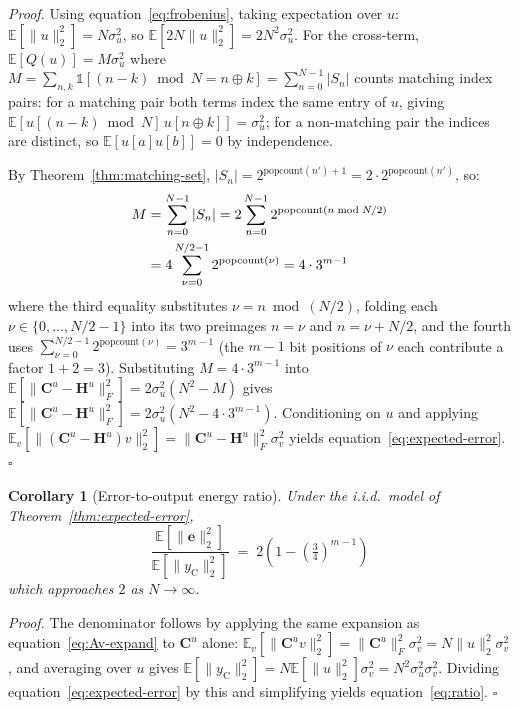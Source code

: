 \documentclass[11pt]{article}
\newtheorem{corollary}[theorem]{Corollary}
\begin{document}
\noindent\textit{Proof.} Using equation~\eqref{eq:frobenius}, taking expectation over $u$: $\mathbb{E}[\|u\|_2^2] = N\sigma_u^2$, so $\mathbb{E}[2N\|u\|_2^2] = 2N^2\sigma_u^2$. For the cross-term, $\mathbb{E}[Q(u)] = M\sigma_u^2$ where $M = \sum_{n,k}\mathbb{1}[(n-k)\bmod N = n\oplus k] = \sum_{n=0}^{N-1}|S_n|$ counts matching index pairs: for a matching pair both terms index the same entry of $u$, giving $\mathbb{E}[u[(n-k)\bmod N]\,u[n\oplus k]] = \sigma_u^2$; for a non-matching pair the indices are distinct, so $\mathbb{E}[u[a]u[b]] = 0$ by independence.

By Theorem~\ref{thm:matching-set}, $|S_n| = 2^{\mathrm{popcount}(n')+1} = 2\cdot 2^{\mathrm{popcount}(n')}$, so:
\begin{align}
    M &= \sum_{n=0}^{N-1}|S_n|
      = 2\sum_{n=0}^{N-1}2^{\mathrm{popcount}(n\bmod N/2)} \notag\\
      &= 4\sum_{\nu=0}^{N/2-1}2^{\mathrm{popcount}(\nu)}
      = 4\cdot 3^{m-1}
\end{align}
where the third equality substitutes $\nu = n\bmod(N/2)$, folding each $\nu \in \{0,\ldots,N/2-1\}$ into its two preimages $n=\nu$ and $n=\nu+N/2$, and the fourth uses $\sum_{\nu=0}^{N/2-1}2^{\mathrm{popcount}(\nu)} = 3^{m-1}$ (the $m-1$ bit positions of $\nu$ each contribute a factor $1+2=3$). Substituting $M = 4\cdot 3^{m-1}$ into $\mathbb{E}[\|\mathbf{C}^u-\mathbf{H}^u\|_F^2] = 2\sigma_u^2(N^2-M)$ gives $\mathbb{E}[\|\mathbf{C}^u-\mathbf{H}^u\|_F^2] = 2\sigma_u^2(N^2 - 4\cdot 3^{m-1})$. Conditioning on $u$ and applying $\mathbb{E}_v[\|(\mathbf{C}^u-\mathbf{H}^u)v\|_2^2] = \|\mathbf{C}^u-\mathbf{H}^u\|_F^2\sigma_v^2$ yields equation~\eqref{eq:expected-error}. $\square$

\medskip
\begin{corollary}[Error-to-output energy ratio]\label{cor:ratio}
Under the i.i.d.\ model of Theorem~\ref{thm:expected-error},
\begin{equation}
    \label{eq:ratio}
    \frac{\mathbb{E}[\|\mathbf{e}\|_2^2]}{\mathbb{E}[\|y_{\mathrm{C}}\|_2^2]} \;=\; 2\!\left(1-\!\left(\tfrac{3}{4}\right)^{\!m-1}\right)
\end{equation}
which approaches $2$ as $N\to\infty$.
\end{corollary}

\noindent\textit{Proof.} The denominator follows by applying the same expansion as equation~\eqref{eq:Av-expand} to $\mathbf{C}^u$ alone: $\mathbb{E}_v[\|\mathbf{C}^u v\|_2^2] = \|\mathbf{C}^u\|_F^2\sigma_v^2 = N\|u\|_2^2\sigma_v^2$, and averaging over $u$ gives $\mathbb{E}[\|y_{\mathrm{C}}\|_2^2] = N\mathbb{E}[\|u\|_2^2]\sigma_v^2 = N^2\sigma_u^2\sigma_v^2$. Dividing equation~\eqref{eq:expected-error} by this and simplifying yields equation~\eqref{eq:ratio}. $\square$
\end{document}
